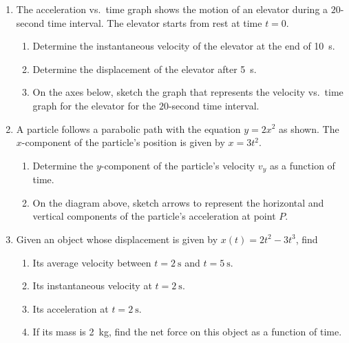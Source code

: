 \documentclass{../../oss-apphys}
\begin{document}
\begin{enumerate}[leftmargin=15pt]

\item The acceleration vs.\ time graph shows the motion of an elevator during a
  $20$-second time interval. The elevator starts from rest at time $t=0$. 
  \begin{center}
  \end{center}
  \begin{enumerate}[noitemsep]
  \item Determine the instantaneous velocity of the elevator at the end of
    \SI{10}{\second}.
    \vspace{1in}
  \item Determine the displacement of the elevator after \SI{5}{\second}.
    \vspace{1in}
  \item On the axes below, sketch the graph that represents the velocity vs.\
    time graph for the elevator for the $20$-second time interval.
    \begin{center}
    \end{center}
    \newpage
  \end{enumerate}
  
\item A particle follows a parabolic path with the equation $y=2x^2$ as shown.
  The $x$-component of the particle's position is given by $x=3t^2$.
  \begin{center}
  \end{center}
  \begin{enumerate}[noitemsep]
  \item Determine the $y$-component of the particle's velocity $v_y$ as a
    function of time.
  \item On the diagram above, sketch arrows to represent the horizontal and
    vertical components of the particle's acceleration at point $P$.
  \end{enumerate}
  \vspace{1in}
\item Given an object whose displacement is given by $x(t)=2t^2-3t^3$, find
  \begin{enumerate}[noitemsep,topsep=0pt]
  \item Its average velocity between $t=\SI{2}{\s}$ and $t=\SI{5}{\s}$.
  \item Its instantaneous velocity at $t=\SI{2}{\s}$.
  \item Its acceleration at $t=\SI{2}{\s}$.
  \item If its mass is \SI{2}{\kg}, find the net force on this object as a
    function of time.
  \end{enumerate}
  \newpage


\end{enumerate}
\end{document}
